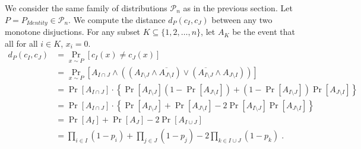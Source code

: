\documentclass[10pt]{article}
\renewcommand{\P}{\mathcal{P}}
\begin{document}
We consider the same family of distributions $\P_n$ as in the previous section.
Let $P = P_{Identity} \in \P_n$. We compute the distance $d_P(c_I, c_J)$
between any two monotone disjuctions. For any subset
$K \subseteq \{1,2,\dots,n\}$, let $A_K$ be the event that all for all $i \in K$, $x_i = 0$.
\begin{align*}
d_P(c_I, c_J)
& = \Pr_{x \sim P}[c_I(x) \neq c_J(x)] \\
& = \Pr_{x \sim P}[A_{I \cap J} \wedge ((A_{I \setminus J} \wedge \overline{A_{J \setminus I}}) \vee (\overline{A_{I \setminus J}} \wedge A_{J \setminus I} )) ] \\
& = \Pr[A_{I \cap J}] \cdot \left\{ \Pr[A_{I \setminus J}] (1 - \Pr[A_{J \setminus I}]) + (1 - \Pr[A_{I \setminus J}]) \Pr[A_{J \setminus I}] \right\} \\
& = \Pr[A_{I \cap J}] \cdot \left\{ \Pr[A_{I \setminus J}] + \Pr[A_{J \setminus I}] - 2 \Pr[A_{I \setminus J}] \Pr[A_{J \setminus I}] \right\} \\
& = \Pr[A_I] + \Pr[A_J] - 2 \Pr[A_{I \cup J}] \\
& = \prod_{i \in I} (1 - p_i) + \prod_{j \in J} (1 - p_j) - 2 \prod_{k \in I \cup J} (1 - p_k) \; . \\
\end{align*}



\end{document}
